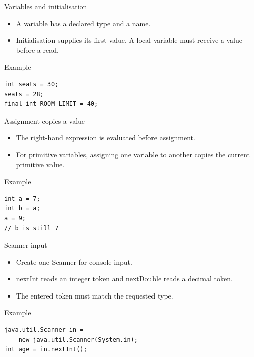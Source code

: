 \documentclass[10pt,aspectratio=169]{beamer}
\begin{document}
\begin{frame}[fragile,t]{Variables and initialisation}
\begin{itemize}
\item A variable has a declared type and a name.
\item Initialisation supplies its first value. A local variable must receive a value before a read.
\end{itemize}
\vspace{1mm}\begin{block}{Example}
\begin{lstlisting}
int seats = 30;
seats = 28;
final int ROOM_LIMIT = 40;
\end{lstlisting}
\end{block}
\end{frame}

\begin{frame}[fragile,t]{Assignment copies a value}
\begin{itemize}
\item The right-hand expression is evaluated before assignment.
\item For primitive variables, assigning one variable to another copies the current primitive value.
\end{itemize}
\vspace{1mm}\begin{block}{Example}
\begin{lstlisting}
int a = 7;
int b = a;
a = 9;
// b is still 7
\end{lstlisting}
\end{block}
\end{frame}

\begin{frame}[fragile,t]{Scanner input}
\begin{itemize}
\item Create one Scanner for console input.
\item nextInt reads an integer token and nextDouble reads a decimal token.
\item The entered token must match the requested type.
\end{itemize}
\vspace{1mm}\begin{block}{Example}
\begin{lstlisting}
java.util.Scanner in =
    new java.util.Scanner(System.in);
int age = in.nextInt();
\end{lstlisting}
\end{block}
\end{frame}
\end{document}
